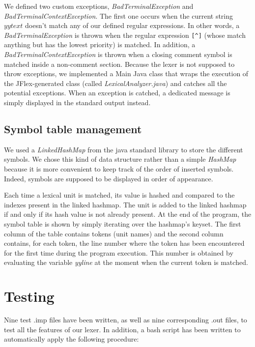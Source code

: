 \documentclass[12pt]{report}
\begin{document}
We defined two custom exceptions, \textit{BadTerminalException} and \textit{BadTerminalContextException}. The first one occurs when the current string
$yytext$ doesn't match any of our defined regular expressions. In other words, a \textit{BadTerminalException} is thrown when the regular expression
\texttt{[\textasciicircum]} (whose match anything but has the lowest priority) is matched. In addition, a
\textit{BadTerminalContextException} is thrown when a closing comment symbol is matched inside a non-comment section.
Because the lexer is not supposed to throw exceptions, we implemented a Main Java class that wraps the execution of the
JFlex-generated class (called \textit{LexicalAnalyzer.java}) and catches all the potential exceptions. When an exception
is catched, a dedicated message is simply displayed in the standard output instead.

\subsection{Symbol table management}

We used a \textit{LinkedHashMap} from the java standard library to store the different symbols. We chose this kind of data structure rather than
a simple \textit{HashMap} because it is more convenient to keep track of the order of inserted symbols. Indeed, symbols are supposed to be
displayed in order of appearance.


Each time a lexical unit is matched, its value is hashed and compared to the indexes present in the linked hashmap. The unit is added to the linked hashmap 
if and only if its hash value is not already present. At the end of the program, the symbol table is shown by simply iterating over the hashmap's keyset. 
The first column of the table contains tokens (unit names) and the second column contains, for each token, the line number where the token has
been encountered for the first time during the program execution. This number is obtained by evaluating the variable \textit{yyline} at the moment when
the current token is matched.

\section{Testing}

Nine test .imp files have been written, as well as nine corresponding .out files, to test all the features of our lexer.
In addition, a bash script has been written to automatically apply the following procedure:
\end{document}
